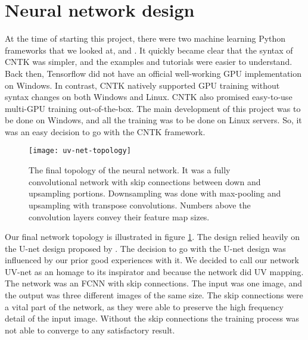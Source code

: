 \section{Neural network design}
\label{sec:net_design}

At the time of starting this project, there were two machine learning Python frameworks that we looked at, \textcite{tensorflow} and \textcite{cntk}. It quickly became clear that the syntax of \ac{CNTK} was simpler, and the examples and tutorials were easier to understand. Back then, Tensorflow did not have an official well-working \ac{GPU} implementation on Windows. In contrast, \ac{CNTK} natively supported \ac{GPU} training without syntax changes on both Windows and Linux. \ac{CNTK} also promised easy-to-use multi-\ac{GPU} training out-of-the-box. The main development of this project was to be done on Windows, and all the training was to be done on Linux servers. So, it was an easy decision to go with the \ac{CNTK} framework.

\begin{figure}
    \texttt{[image: uv-net-topology]}
    \caption[Neural network topology]{The final topology of the neural network. It was a fully convolutional network with skip connections between down and upsampling portions. Downsampling was done with max-pooling and upsampling with transpose convolutions. Numbers above the convolution layers convey their feature map sizes.}
    \label{fig:net_top_1}
\end{figure}

Our final network topology is illustrated in figure \ref{fig:net_top_1}. The design relied heavily on the U-net design proposed by \textcite{Ronneberger2015}. The decision to go with the U-net design was influenced by our prior good experiences with it. We decided to call our network UV-net as an homage to its inspirator and because the network did UV mapping. The network was an \ac{FCNN} with skip connections. The input was one image, and the output was three different images of the same size. The skip connections were a vital part of the network, as they were able to preserve the high frequency detail of the input image. Without the skip connections the training process was not able to converge to any satisfactory result.

